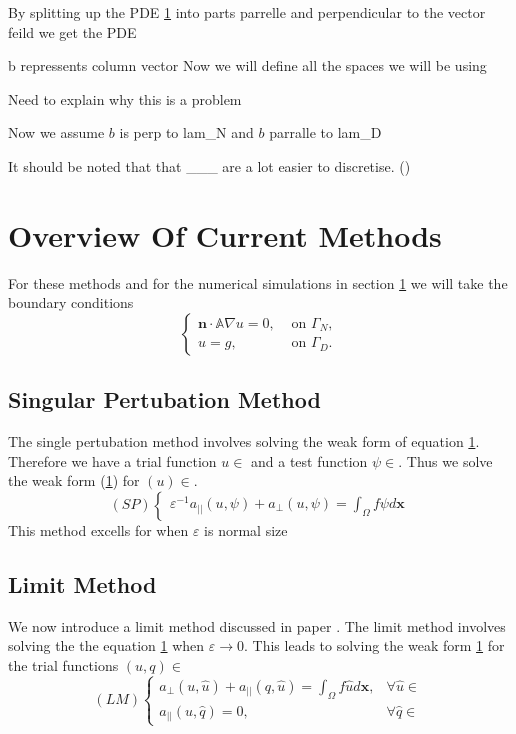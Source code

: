 \documentclass[12pt,a4paper]{article}
\begin{document}
By splitting up the PDE \ref{} into parts parrelle and perpendicular to the vector feild we get the PDE 

b repressents column vector 
Now we will define all the spaces we will be using

Need to explain why this is a problem

Now we assume $b$ is perp to lam_N and $b$ parralle to lam_D

It should be noted that that ___ are a lot easier to discretise. ()

\section{Overview Of Current Methods}
For these methods and for the numerical simulations in section \ref{} we will take the boundary conditions
\begin{equation}
\begin{cases}
\mathbf{n}\cdot \mathbb{A}\nabla u = 0, & \text{ on }\Gamma_N, \\
u = g, & \text{  on }\Gamma_D.
\end{cases}
\end{equation}

\subsection{Singular Pertubation Method} \label{SP}
The single pertubation method involves solving the weak form of equation \ref{}. Therefore we have a trial function $u \in $ and a test function $\psi \in$. Thus we solve the weak form (\ref{}) for $(u) \in $.
\begin{equation}
(SP)
\begin{cases}
\varepsilon^{-1}a_{||}(u, \psi) + a_{\perp}(u, \psi) = \int_{\Omega} f \psi d\mathbf{x}
\end{cases}
\end{equation}
This method excells for when $\varepsilon$ is normal size

\subsection{Limit Method} \label{LM}
We now introduce a limit method discussed in paper \cite{}. The limit method involves solving the the equation \ref{} when $\varepsilon \rightarrow 0$. This leads to solving the weak form \ref{} for the trial functions $(u, q) \in $ 
\begin{equation}
(LM)
\begin{cases}
a_{\perp}(u, \hat{u}) + a_{||}(q, \hat{u}) = \int_{\Omega} f \hat{u} d\mathbf{x}, 
&\forall \hat{u} \in \\
a_{||}(u, \hat{q}) = 0, & \forall \hat{q} \in 
\end{cases}
\end{equation}
\end{document}
